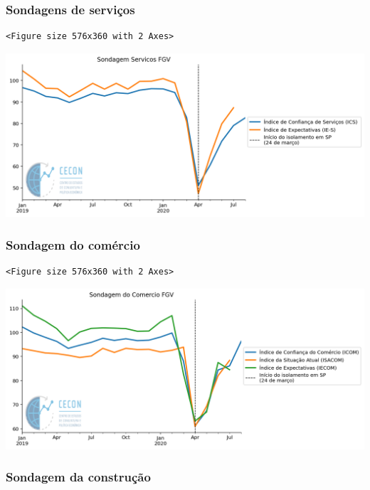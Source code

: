 \documentclass[11pt]{article}
\begin{document}
\subsubsection{Sondagens de serviços}
\label{sec:org439db94}

\begin{verbatim}
<Figure size 576x360 with 2 Axes>
\end{verbatim}


\begin{center}
\includegraphics[width=.9\linewidth]{obipy-resources/62e383af79e91b63c7fc98dd7fb55b3c3ececcb9/aa0dc5316591c59e078ea9eb54ee5d1847c03529.png}
\end{center}


\subsubsection{Sondagem do comércio}
\label{sec:orgbc1fa86}

\begin{verbatim}
<Figure size 576x360 with 2 Axes>
\end{verbatim}


\begin{center}
\includegraphics[width=.9\linewidth]{obipy-resources/62e383af79e91b63c7fc98dd7fb55b3c3ececcb9/554f61127530cd8c56d7d2bb715c64b18b66079b.png}
\end{center}

\subsubsection{Sondagem da construção}
\label{sec:orgb7aab35}
\end{document}
